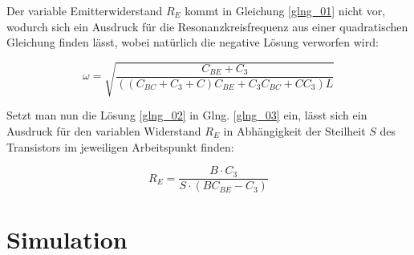 Der variable Emitterwiderstand $R_E$ kommt in Gleichung \ref{glng_01} nicht vor, wodurch sich ein Ausdruck für die Resonanzkreisfrequenz aus einer quadratischen Gleichung finden lässt, wobei natürlich die negative Lösung verworfen wird: 

\begin{equation}
    \label{glng_02}
    \omega = \sqrt{\frac{C_{BE} + C_3}{\left( \left( C_{BC} + C_3 + C\right)C_{BE} + C_3 C_{BC} + CC_3 \right) L}}
\end{equation}

Setzt man nun die Lösung \ref{glng_02} in Glng. \ref{glng_03} ein, lässt sich ein Ausdruck für den variablen Widerstand $R_E$ in Abhängigkeit der Steilheit $S$ des Transistors im jeweiligen Arbeitspunkt finden:

\begin{equation}
    R_E = \frac{B \cdot C_3}{S \cdot \left( B C_{BE} - C_3\right)}
\end{equation}

\section{Simulation}
